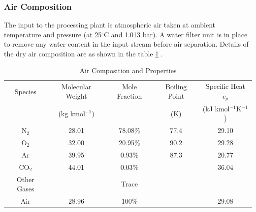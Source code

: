 	\subsubsection{Air Composition} \noindent
    The input to the processing plant is atmospheric air taken at ambient temperature and pressure (at 25$^\circ$C and 1.013 bar). A water filter unit is in place to remove any water content in the input stream before air separation. Details of the dry air composition are as shown in the table \ref{table:air_properties} \citep{hands1986,barron1985,HLT}.
    \begin{table}[ht]
        \singlespacing
	    \centering
	    \caption{Air Composition and Properties}
	    \label{table:air_properties}
        
	    \begin{tabular}{|c|cccc|}
	    \hline
	    Species 	& Molecular Weight	& Mole Fraction & Boiling Point 	& Specific Heat $\tilde{c}_p$ \\
                    & (kg kmol$^{-1}$)    &               & (K)               & (kJ kmol$^{-1}$K$^{-1}$)\\
	    \hline
	    N$_2$		& 28.01				& 78.08\%		& 77.4				& 29.10 \\
	    O$_2$		& 32.00				& 20.95\%		& 90.2				& 29.28 \\
	    Ar			& 39.95				& 0.93\%		& 87.3				& 20.77 \\ 
	    CO$_2$		& 44.01				& 0.03\%		&					& 36.04 \\
	    Other Gases &					& Trace	    	& 					&       \\
	    \hline
	    Air         & 28.96             & 100\%         &                   & 29.08 \\
	    \hline
	    \end{tabular}
    \end{table}
